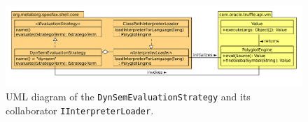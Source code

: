 \begin{figure}[t]
  \centering
  \includegraphics[width=\textwidth]{uml-dynsem-eval-strat}
  \caption{UML diagram of the \texttt{DynSemEvaluationStrategy} and its
    collaborator \texttt{IInterpreterLoader}.}
  \label{fig:uml-dynsem-eval-strat}
\end{figure}

